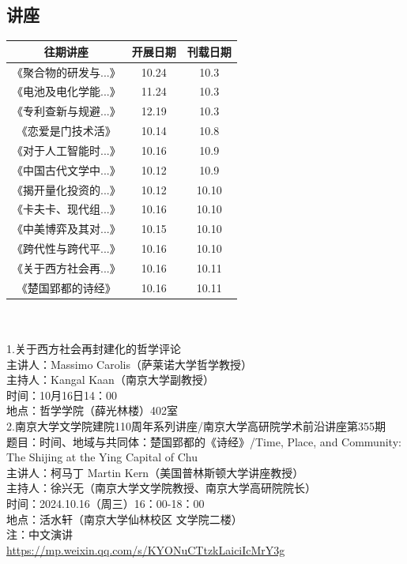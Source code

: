 \documentclass[letterpaper, 12pt]{article}
\begin{document}
\begin{multicols}{2}
\section{讲座}
\begin{tabular}{|c|c|c|}
    \hline
    往期讲座 & 开展日期 & 刊载日期\\
    \hline\hline
    《聚合物的研发与...》 & 10.24 & 10.3\\
    《电池及电化学能...》 & 11.24 & 10.3\\
    《专利查新与规避...》 & 12.19 & 10.3\\
    《恋爱是门技术活》 & 10.14 & 10.8\\
    《对于人工智能时...》 & 10.16 & 10.9\\
    《中国古代文学中...》 & 10.12 & 10.9\\
    《揭开量化投资的...》 & 10.12 & 10.10\\
    《卡夫卡、现代组...》 & 10.16 & 10.10\\
    《中美博弈及其对...》 & 10.15 & 10.10\\
    《跨代性与跨代平...》 & 10.16 & 10.10\\
    《关于西方社会再...》 & 10.16 & 10.11\\
    《楚国郢都的诗经》 & 10.16 & 10.11\\
      \hline
\end{tabular}\\\\

1.关于西方社会再封建化的哲学评论\\
主讲人：Massimo Carolis（萨莱诺大学哲学教授）\\
主持人：Kangal Kaan（南京大学副教授）\\
时间：10月16日14：00\\
地点：哲学学院（薛光林楼）402室\\

2.南京大学文学院建院110周年系列讲座/南京大学高研院学术前沿讲座第355期\\
题目：时间、地域与共同体：楚国郢都的《诗经》/Time, Place, and Community: The Shijing at the Ying Capital of Chu\\
主讲人：柯马丁 Martin Kern（美国普林斯顿大学讲座教授）\\
主持人：徐兴无（南京大学文学院教授、南京大学高研院院长）\\
时间：2024.10.16（周三）16：00-18：00\\
地点：活水轩（南京大学仙林校区 文学院二楼）\\
注：中文演讲\\
\url{https://mp.weixin.qq.com/s/KYONuCTtzkLaiciIcMrY3g}\\


\end{multicols}
\end{document}
